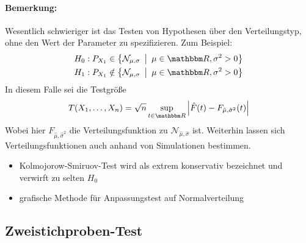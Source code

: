 \paragraph{Bemerkung:}
Wesentlich schwieriger ist das Testen von Hypothesen über den Verteilungstyp, ohne den Wert der Parameter zu spezifizieren.
Zum Beispiel:
\begin{alignat*}{3}
	H_0: P_{X_1} \in \set{\mathcal{N}_{\mu,\sigma}}{\mu\in\SR, \sigma^2>0} \\
	H_1: P_{X_1} \notin \set{\mathcal{N}_{\mu,\sigma}}{\mu\in\SR, \sigma^2>0}
\end{alignat*}
In diesem Falle sei die Testgröße
\[
	T(X_1,\ldots,X_n) = \sqrt{n} \sup_{t\in\SR} \abs{ \hat{F}(t) - F_{\hat{\mu},\hat{\sigma}^2}(t) }
\]
Wobei hier $F_{\hat{\mu},\hat{\sigma}^2}$ die Verteilungsfunktion zu $\mathcal{N}_{\hat{\mu},\hat{\sigma}}$ ist.
Weiterhin lassen sich Verteilungsfunktionen auch anhand von Simulationen bestimmen.
\begin{itemize}
	\item Kolmojorow-Smiruov-Test wird als extrem konservativ bezeichnet und verwirft zu selten $H_0$
	\item grafische Methode für Anpassungstest auf Normalverteilung
\end{itemize}

\subsection{Zweistichproben-Test} %
\label{sub:zweistichproben_test}


